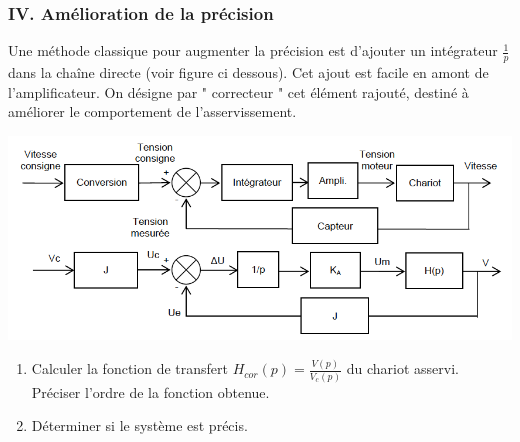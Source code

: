 \subsubsection{IV. Am\'elioration de la pr\'ecision}
Une m\'ethode classique pour augmenter la pr\'ecision est d'ajouter un int\'egrateur $\frac{1}{p}$ dans la cha\^ine directe (voir figure ci dessous). Cet ajout est facile en amont de l'amplificateur. On d\'esigne par " correcteur " cet \'el\'ement rajout\'e, destin\'e \`a am\'eliorer le comportement de l'asservissement.
\\ \hspace*{0mm}
\begin{center} \includegraphics[scale=0.5]{png/bloc2_prob2.png}\end{center}
\hspace*{0mm}

\begin{enumerate}
\item Calculer la fonction de transfert \(H_{cor}(p)=\frac{V(p)}{V_c(p)}\) du chariot asservi. Pr\'eciser l'ordre de la fonction obtenue.
\item D\'eterminer si le syst\`eme est pr\'ecis.
\end{enumerate}

